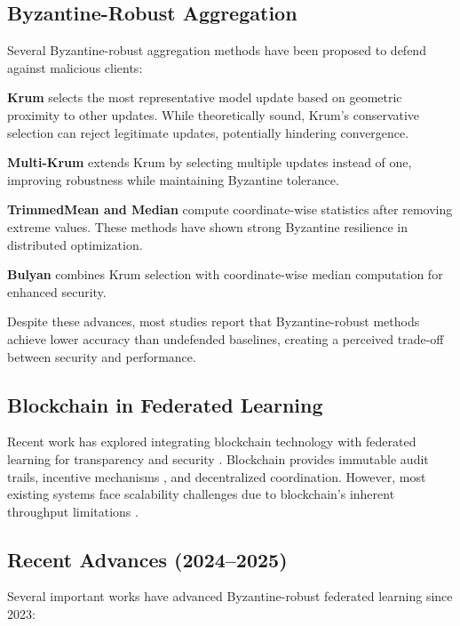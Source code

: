 \documentclass[12pt,a4paper,onecolumn]{article}
\begin{document}
\subsection{Byzantine-Robust Aggregation}

Several Byzantine-robust aggregation methods have been proposed to defend against malicious clients:

\textbf{Krum} \cite{blanchard2017machine} selects the most representative model update based on geometric proximity to other updates. While theoretically sound, Krum's conservative selection can reject legitimate updates, potentially hindering convergence.

\textbf{Multi-Krum} extends Krum by selecting multiple updates instead of one, improving robustness while maintaining Byzantine tolerance.

\textbf{TrimmedMean and Median} \cite{yin2018byzantine} compute coordinate-wise statistics after removing extreme values. These methods have shown strong Byzantine resilience in distributed optimization.

\textbf{Bulyan} \cite{mhamdi2018hidden} combines Krum selection with coordinate-wise median computation for enhanced security.

Despite these advances, most studies report that Byzantine-robust methods achieve lower accuracy than undefended baselines, creating a perceived trade-off between security and performance.

\subsection{Blockchain in Federated Learning}

Recent work has explored integrating blockchain technology with federated learning for transparency and security \cite{kim2019blockchained,li2020blockchain,shayan2021biscotti,zhang2021blockchain}. Blockchain provides immutable audit trails, incentive mechanisms \cite{toyoda2020mechanism}, and decentralized coordination. However, most existing systems face scalability challenges due to blockchain's inherent throughput limitations \cite{wu2024blockchain}.

\subsection{Recent Advances (2024--2025)}

Several important works have advanced Byzantine-robust federated learning since 2023:
\end{document}
